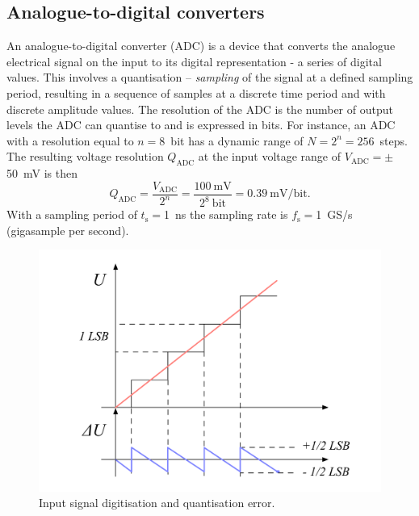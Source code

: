 \subsection{Analogue-to-digital converters}
An analogue-to-digital converter (ADC) is a device that converts the analogue electrical signal on the input to its digital representation - a series of digital values. This involves a quantisation -- \emph{sampling} of the signal at a defined sampling period, resulting in a sequence of samples at a discrete time period and with discrete amplitude values. The resolution of the ADC is the number of output levels the ADC can quantise to and is expressed in bits. For instance, an ADC with a resolution equal to $n=8$~bit  has a dynamic range of $N=2^n=256$~steps. The resulting voltage resolution $Q_\mathrm{ADC}$ at the input voltage range of $V_\mathrm{ADC}=\pm$50~mV is then
\begin{equation}
\label{eq:mvpercnt}
Q_\mathrm{ADC}=\frac{V_\mathrm{ADC}}{2^{n}}  = \frac{100~\mathrm{mV}}{2^8~\mathrm{bit}} = 0.39~\mathrm{mV/bit}.
\end{equation} 
With a sampling period of $t_\mathrm{s}=$1~ns the sampling rate is $f_\mathrm{s}=$1~GS/s (gigasample per second).
\begin{figure}[!t]
\begin{center}
\includegraphics[width=0.7\linewidth]{02_pulse_formation/pics/plots/qerr}
\caption{Input signal digitisation and quantisation error.}
\label{fig:qerr}
\end{center}
\end{figure}

